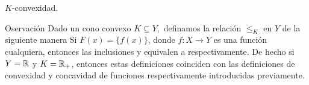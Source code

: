 \begin{frame}{$K$-convexidad.}
  \begin{exampleblock}{Oservación}
    Dado un cono convexo $K\subseteq Y,$ 
    definamos la relación $\leq_K$ en $Y$
    de la siguiente manera
    Si $F(x)=\{f(x)\}$, donde $f:X\to Y$ es una función 
    cualquiera, entonces las inclusiones  
    y  equivalen a 
    respectivamente. De hecho si $Y=\mathbb{R}$ y $K=\mathbb{R}_+$, 
    entonces estas definiciones coinciden con las 
    definiciones de convexidad y concavidad de funciones 
    respectivamente introducidas previamente.
  \end{exampleblock}
\end{frame}